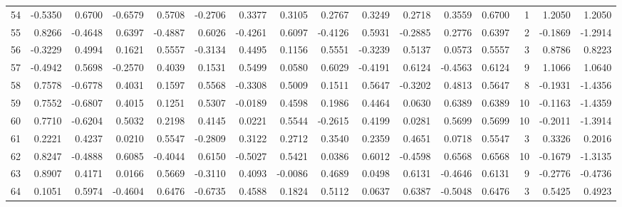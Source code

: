 \begin{tabular}{lrrrrrrrrrrrrrrr}
54  &     -0.5350 &  0.6700 & -0.6579 &  0.5708 & -0.2706 &  0.3377 &  0.3105 &  0.2767 &  0.3249 &  0.2718 &   0.3559 &     0.6700 &      1 &                    1.2050 &                     1.2050 \\
55  &      0.8266 & -0.4648 &  0.6397 & -0.4887 &  0.6026 & -0.4261 &  0.6097 & -0.4126 &  0.5931 & -0.2885 &   0.2776 &     0.6397 &      2 &                   -0.1869 &                    -1.2914 \\
56  &     -0.3229 &  0.4994 &  0.1621 &  0.5557 & -0.3134 &  0.4495 &  0.1156 &  0.5551 & -0.3239 &  0.5137 &   0.0573 &     0.5557 &      3 &                    0.8786 &                     0.8223 \\
57  &     -0.4942 &  0.5698 & -0.2570 &  0.4039 &  0.1531 &  0.5499 &  0.0580 &  0.6029 & -0.4191 &  0.6124 &  -0.4563 &     0.6124 &      9 &                    1.1066 &                     1.0640 \\
58  &      0.7578 & -0.6778 &  0.4031 &  0.1597 &  0.5568 & -0.3308 &  0.5009 &  0.1511 &  0.5647 & -0.3202 &   0.4813 &     0.5647 &      8 &                   -0.1931 &                    -1.4356 \\
59  &      0.7552 & -0.6807 &  0.4015 &  0.1251 &  0.5307 & -0.0189 &  0.4598 &  0.1986 &  0.4464 &  0.0630 &   0.6389 &     0.6389 &     10 &                   -0.1163 &                    -1.4359 \\
60  &      0.7710 & -0.6204 &  0.5032 &  0.2198 &  0.4145 &  0.0221 &  0.5544 & -0.2615 &  0.4199 &  0.0281 &   0.5699 &     0.5699 &     10 &                   -0.2011 &                    -1.3914 \\
61  &      0.2221 &  0.4237 &  0.0210 &  0.5547 & -0.2809 &  0.3122 &  0.2712 &  0.3540 &  0.2359 &  0.4651 &   0.0718 &     0.5547 &      3 &                    0.3326 &                     0.2016 \\
62  &      0.8247 & -0.4888 &  0.6085 & -0.4044 &  0.6150 & -0.5027 &  0.5421 &  0.0386 &  0.6012 & -0.4598 &   0.6568 &     0.6568 &     10 &                   -0.1679 &                    -1.3135 \\
63  &      0.8907 &  0.4171 &  0.0166 &  0.5669 & -0.3110 &  0.4093 & -0.0086 &  0.4689 &  0.0498 &  0.6131 &  -0.4646 &     0.6131 &      9 &                   -0.2776 &                    -0.4736 \\
64  &      0.1051 &  0.5974 & -0.4604 &  0.6476 & -0.6735 &  0.4588 &  0.1824 &  0.5112 &  0.0637 &  0.6387 &  -0.5048 &     0.6476 &      3 &                    0.5425 &                     0.4923 \\

\end{tabular}
